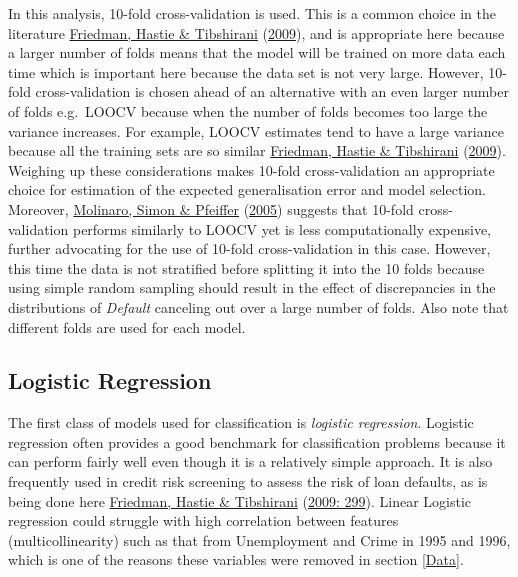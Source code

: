 \documentclass[11pt,preprint, authoryear]{elsarticle}
\numberwithin{equation}{section}
\numberwithin{figure}{section}
\numberwithin{table}{section}
\begin{document}
In this analysis, 10-fold cross-validation is used. This is a common
choice in the literature \protect\hyperlink{ref-ESL}{Friedman, Hastie \&
Tibshirani} (\protect\hyperlink{ref-ESL}{2009}), and is appropriate here
because a larger number of folds means that the model will be trained on
more data each time which is important here because the data set is not
very large. However, 10-fold cross-validation is chosen ahead of an
alternative with an even larger number of folds \textemdash e.g.~LOOCV
\textemdash because when the number of folds becomes too large the
variance increases. For example, LOOCV estimates tend to have a large
variance because all the training sets are so similar
\protect\hyperlink{ref-ESL}{Friedman, Hastie \& Tibshirani}
(\protect\hyperlink{ref-ESL}{2009}). Weighing up these considerations
makes 10-fold cross-validation an appropriate choice for estimation of
the expected generalisation error and model selection. Moreover,
\protect\hyperlink{ref-Molinaro}{Molinaro, Simon \& Pfeiffer}
(\protect\hyperlink{ref-Molinaro}{2005}) suggests that 10-fold
cross-validation performs similarly to LOOCV yet is less computationally
expensive, further advocating for the use of 10-fold cross-validation in
this case. However, this time the data is not stratified before
splitting it into the 10 folds because using simple random sampling
should result in the effect of discrepancies in the distributions of
\emph{Default} canceling out over a large number of folds. Also note
that different folds are used for each model.

\hypertarget{logistic-regression}{%
\subsection{Logistic Regression}\label{logistic-regression}}

The first class of models used for classification is \emph{logistic
regression}. Logistic regression often provides a good benchmark for
classification problems because it can perform fairly well even though
it is a relatively simple approach. It is also frequently used in credit
risk screening to assess the risk of loan defaults, as is being done
here \protect\hyperlink{ref-ESL}{Friedman, Hastie \& Tibshirani}
(\protect\hyperlink{ref-ESL}{2009: 299}). Linear Logistic regression
could struggle with high correlation between features
(multicollinearity) such as that from Unemployment and Crime in 1995 and
1996, which is one of the reasons these variables were removed in
section \ref{Data}.
\end{document}

